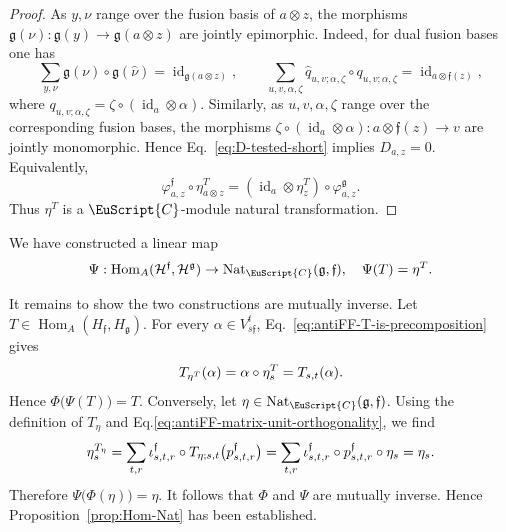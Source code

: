 \documentclass[a4paper,11pt]{article}
\theoremstyle{definition}
\theoremstyle{remark}
\newcommand\eC           {\EuScript{C}}
\newcommand{\id}{\operatorname{id}}
\newcommand{\Hom}{\operatorname{Hom}}
\begin{document}
\begin{proof}
As $y,\nu$ range over the fusion basis of $a\otimes z$, the
morphisms $\mathfrak g(\nu): \mathfrak g(y)\to \mathfrak g(a\otimes z)$ are jointly epimorphic. 
Indeed, for dual fusion bases one has
\[
\sum_{y,\nu}
\mathfrak g(\nu)\circ\mathfrak g(\widehat\nu)
=
\id_{\mathfrak g(a\otimes z)},
\qquad
\sum_{u,v,\alpha,\zeta}
\widehat q_{u,v;\alpha,\zeta}
\circ
q_{u,v;\alpha,\zeta}
=
\id_{a\otimes\mathfrak f(z)},
\]
where $q_{u,v;\alpha,\zeta} = \zeta\circ(\id_a\otimes\alpha)$.  Similarly, as
$u,v,\alpha,\zeta$ range over the corresponding fusion bases, the
morphisms $\zeta\circ(\id_a\otimes\alpha): a\otimes\mathfrak f(z)\to v$ are jointly monomorphic. 
Hence Eq.~\eqref{eq:D-tested-short} implies $D_{a,z}=0$. Equivalently,
\begin{equation*}
    \varphi^{\mathfrak f}_{a,z} \circ \eta_{a\otimes z}^T = (\id_a\otimes\eta_z^T) \circ \varphi^{\mathfrak g}_{a,z}. 
\end{equation*}
Thus $\eta^T$ is a $\eC$-module natural transformation.
\end{proof}

We have constructed a linear map
\begin{equation}
    \notag
    \Psi:\operatorname{Hom}_{A}(\mathcal{H}^{\mathfrak f},\mathcal{H}^{\mathfrak g})\to\operatorname{Nat}_{\eC}(\mathfrak g,\mathfrak f),\quad\Psi(T)=\eta^T.
\end{equation}

It remains to show the two constructions are mutually inverse.
Let $T\in \Hom_A(H_{\mathfrak f},H_{\mathfrak g})$. For every
$\alpha\in V^t_{s\mathfrak f}$,
Eq.~\eqref{eq:antiFF-T-is-precomposition} gives
\begin{equation}
    \notag
    T_{\eta^T}(\alpha) = \alpha\circ\eta^T_s = T_{s,t}(\alpha).
\end{equation}
Hence $\Phi \bigl(\Psi(T)\bigr)=T$. 
Conversely, let $\eta\in \operatorname{Nat}_{\eC}(\mathfrak g,\mathfrak f)$.  Using the definition of $T_\eta$ and Eq.\eqref{eq:antiFF-matrix-unit-orthogonality}, we find
\begin{equation}
    \notag
    \eta^{T_\eta}_s = \sum_{t,r} \iota^{\mathfrak f}_{s,t,r} \circ T_{\eta;s,t} \bigl(p^{\mathfrak f}_{s,t,r}\bigr) = \sum_{t,r} \iota^{\mathfrak f}_{s,t,r} \circ p^{\mathfrak f}_{s,t,r} \circ \eta_s  = \eta_s. 
\end{equation}
Therefore $\Psi\bigl(\Phi(\eta)\bigr)=\eta$. It follows that $\Phi$ and $\Psi$ are mutually inverse. Hence Proposition~\ref{prop:Hom-Nat} has been established. 







\end{document}
